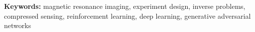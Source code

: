 





\textbf{Keywords:} magnetic resonance imaging, experiment design, inverse problems, compressed sensing, reinforcement learning, deep learning, generative adversarial networks





